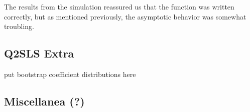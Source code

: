 \documentclass[12pt]{article}
\begin{document}
The results from the simulation reassured us that the function was written correctly, but as mentioned previously, the asymptotic behavior was somewhat troubling.


\subsection{Q2SLS Extra} \label{appendix_q2sls}

put bootstrap coefficient distributions here


\subsection{Miscellanea (?)}
\end{document}
